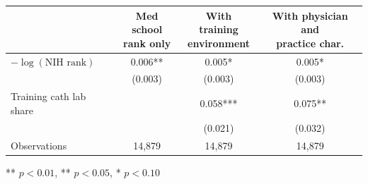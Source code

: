 \begin{threeparttable}
\begin{tabular}{lccc}
\toprule
 & \shortstack{Med school\\rank only} & \shortstack{With training\\environment} & \shortstack{With physician and\\practice char.} \\
\midrule
$-\log(\text{NIH rank})$ & 0.006** & 0.005* & 0.005* \\
 & (0.003) & (0.003) & (0.003) \\
Training cath lab share &   & 0.058*** & 0.075** \\
 &   & (0.021) & (0.032) \\
\midrule
Observations & 14,879 & 14,879 & 14,879 \\
\bottomrule
\end{tabular}
\begin{tablenotes}[flushleft]
\footnotesize
\item *** $p < 0.01$, ** $p < 0.05$, * $p < 0.10$
\end{tablenotes}
\end{threeparttable}
